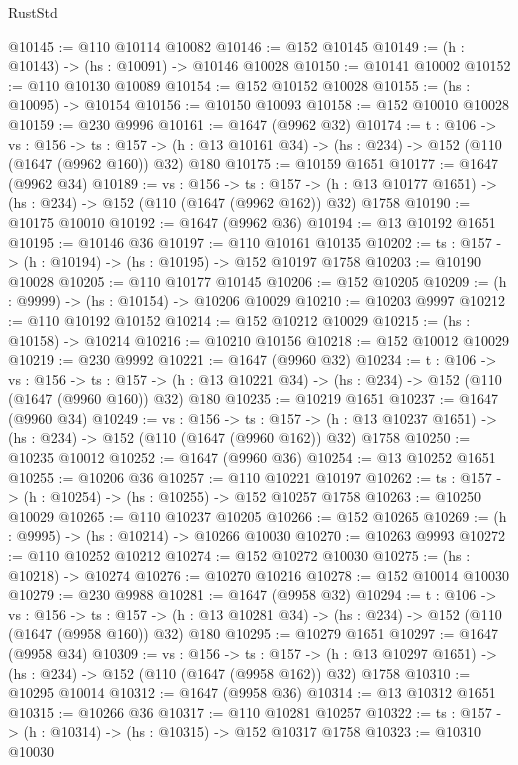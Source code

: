 \begin{lexlean}{RustStd}
\begin{coremodule}
@10145 := @110 @10114 @10082
@10146 := @152 @10145
@10149 := (h : @10143) -> (hs : @10091) -> @10146 @10028
@10150 := @10141 @10002
@10152 := @110 @10130 @10089
@10154 := @152 @10152 @10028
@10155 := (hs : @10095) -> @10154
@10156 := @10150 @10093
@10158 := @152 @10010 @10028
@10159 := @230 @9996
@10161 := @1647 (@9962 @32)
@10174 := {t : @106} ->
  {vs : @156} ->
  {ts : @157} -> (h : @13 @10161 @34) -> (hs : @234) -> @152 (@110 (@1647 (@9962 @160)) @32) @180
@10175 := @10159 @1651
@10177 := @1647 (@9962 @34)
@10189 := {vs : @156} ->
  {ts : @157} -> (h : @13 @10177 @1651) -> (hs : @234) -> @152 (@110 (@1647 (@9962 @162)) @32) @1758
@10190 := @10175 @10010
@10192 := @1647 (@9962 @36)
@10194 := @13 @10192 @1651
@10195 := @10146 @36
@10197 := @110 @10161 @10135
@10202 := {ts : @157} -> (h : @10194) -> (hs : @10195) -> @152 @10197 @1758
@10203 := @10190 @10028
@10205 := @110 @10177 @10145
@10206 := @152 @10205
@10209 := (h : @9999) -> (hs : @10154) -> @10206 @10029
@10210 := @10203 @9997
@10212 := @110 @10192 @10152
@10214 := @152 @10212 @10029
@10215 := (hs : @10158) -> @10214
@10216 := @10210 @10156
@10218 := @152 @10012 @10029
@10219 := @230 @9992
@10221 := @1647 (@9960 @32)
@10234 := {t : @106} ->
  {vs : @156} ->
  {ts : @157} -> (h : @13 @10221 @34) -> (hs : @234) -> @152 (@110 (@1647 (@9960 @160)) @32) @180
@10235 := @10219 @1651
@10237 := @1647 (@9960 @34)
@10249 := {vs : @156} ->
  {ts : @157} -> (h : @13 @10237 @1651) -> (hs : @234) -> @152 (@110 (@1647 (@9960 @162)) @32) @1758
@10250 := @10235 @10012
@10252 := @1647 (@9960 @36)
@10254 := @13 @10252 @1651
@10255 := @10206 @36
@10257 := @110 @10221 @10197
@10262 := {ts : @157} -> (h : @10254) -> (hs : @10255) -> @152 @10257 @1758
@10263 := @10250 @10029
@10265 := @110 @10237 @10205
@10266 := @152 @10265
@10269 := (h : @9995) -> (hs : @10214) -> @10266 @10030
@10270 := @10263 @9993
@10272 := @110 @10252 @10212
@10274 := @152 @10272 @10030
@10275 := (hs : @10218) -> @10274
@10276 := @10270 @10216
@10278 := @152 @10014 @10030
@10279 := @230 @9988
@10281 := @1647 (@9958 @32)
@10294 := {t : @106} ->
  {vs : @156} ->
  {ts : @157} -> (h : @13 @10281 @34) -> (hs : @234) -> @152 (@110 (@1647 (@9958 @160)) @32) @180
@10295 := @10279 @1651
@10297 := @1647 (@9958 @34)
@10309 := {vs : @156} ->
  {ts : @157} -> (h : @13 @10297 @1651) -> (hs : @234) -> @152 (@110 (@1647 (@9958 @162)) @32) @1758
@10310 := @10295 @10014
@10312 := @1647 (@9958 @36)
@10314 := @13 @10312 @1651
@10315 := @10266 @36
@10317 := @110 @10281 @10257
@10322 := {ts : @157} -> (h : @10314) -> (hs : @10315) -> @152 @10317 @1758
@10323 := @10310 @10030

\end{coremodule}
\end{lexlean}
